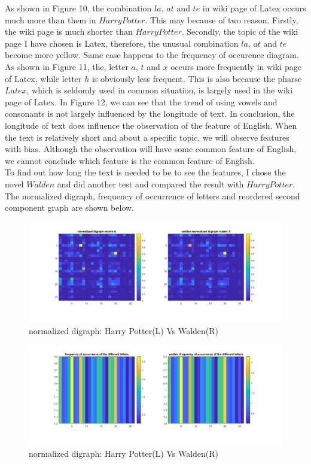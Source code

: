 \documentclass[a4paper]{article}
\begin{document}
As shown in Figure 10, the combination $la$, $at$ and $te$ in wiki page of Latex occurs much more than them in $Harry Potter$. This may because of two reason. Firstly, the wiki page is much shorter than $Harry Potter$. Secondly, the topic of the wiki page I have chosen is Latex, therefore, the unusual combination $la$, $at$ and $te$ become more yellow. Same case happens to the frequency of occurence diagram. As shown in Figure 11, the, letter $a$, $t$ and $x$ occurs more frequently in wiki page of Latex, while letter $h$ is obviously less frequent. This is also because the pharse $Latex$, which is seldomly used in common situation, is largely used in the wiki page of Latex. In Figure 12, we can see that the trend of using vowels and consonants is not largely influenced by the longitude of text. In conclusion, the longitude of text does influence the observation of the feature of English. When the text is relatively short and about a specific topic, we will observe features with bias. Although the observation will have some common feature of English, we cannot conclude which feature is the common feature of English.\\
\indent To find out how long the text is needed to be to see the features, I chose the novel $Walden$ and did another test and compared the result with $Harry Potter$. The normalized digraph, frequency of occurrence of letters and reordered second component graph are shown below.

\begin{figure}[H] 
\centering 
\includegraphics[width=1.0\textwidth]{2.6-1.png}
\caption{normalized digraph: Harry Potter(L) Vs Walden(R)} 
\label{Fig.2.6-1} 
\end{figure}

\begin{figure}[H] 
\centering 
\includegraphics[width=1.0\textwidth]{2.6-2.png}
\caption{normalized digraph: Harry Potter(L) Vs Walden(R)} 
\label{Fig.2.6-2} 
\end{figure}
\end{document}
